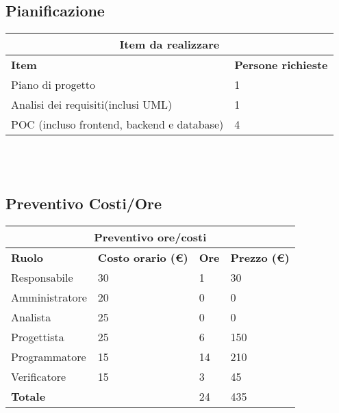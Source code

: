 \documentclass[12pt]{article}
\begin{document}
\subsection{Pianificazione}
\begin{center}
    \begin{tabularx}{\textwidth}{|X|X|}
        \hline
        \multicolumn{2}{|c|}{\textbf{Item da realizzare}}\\
        \hline
        \hline
        \textbf{Item} & \textbf{Persone richieste}\\
        \hline
        Piano di progetto & 1\\
        \hline
        Analisi dei requisiti(inclusi UML) & 1 \\
        \hline
        POC (incluso frontend, backend e database) & 4 \\
        \hline
    \end{tabularx}\\[8pt]
    \mbox{}\\
\end{center}
\subsection{Preventivo Costi/Ore}
\begin{center}
    \begin{tabularx}{\textwidth}{|X|X|X|X|}
        \hline
        \multicolumn{4}{|c|}{\textbf{Preventivo ore/costi}}\\
        \hline
        \hline
        \textbf{Ruolo} & \textbf{Costo orario (\euro)} & \textbf{Ore} & \textbf{Prezzo (\euro)}\\
        \hline
        Responsabile    & 30 & 1  & 30\\   
        \hline
        Amministratore  & 20 & 0  & 0\\ 
        \hline
        Analista        & 25 & 0  & 0\\ 
        \hline
        Progettista     & 25 & 6  & 150\\
        \hline
        Programmatore   & 15 & 14  & 210\\
        \hline
        Verificatore    & 15 & 3  & 45\\
        \hline
        \textbf{Totale} &    & 24 & 435\\
        \hline
    \end{tabularx}\\[8pt]
    \mbox{}\\
\end{center}
\end{document}
